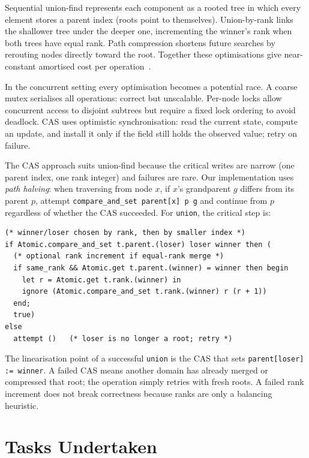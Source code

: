 \documentclass[11pt,a4paper]{article}
\begin{document}
Sequential union-find represents each component as a rooted tree in which every
element stores a parent index (roots point to themselves).  Union-by-rank links
the shallower tree under the deeper one, incrementing the winner's rank when
both trees have equal rank.  Path compression shortens future searches by
rerouting nodes directly toward the root.  Together these optimisations give
near-constant amortised cost per operation~\cite{AoMPP}.

In the concurrent setting every optimisation becomes a potential race.
A coarse mutex serialises all operations: correct but unscalable.  Per-node
locks allow concurrent access to disjoint subtrees but require a fixed lock
ordering to avoid deadlock.  CAS uses optimistic synchronisation: read the
current state, compute an update, and install it only if the field still holds
the observed value; retry on failure.

The CAS approach suits union-find because the critical writes are narrow
(one parent index, one rank integer) and failures are rare.  Our implementation
uses \emph{path halving}: when traversing from node $x$, if $x$'s grandparent
$g$ differs from its parent $p$, attempt \texttt{compare\_and\_set parent[x] p g}
and continue from $p$ regardless of whether the CAS succeeded.  For
\texttt{union}, the critical step is:

\begin{lstlisting}[language=caml,caption={CAS link in \texttt{union} (\texttt{cas\_union\_find.ml}).},label={lst:cas-union}]
(* winner/loser chosen by rank, then by smaller index *)
if Atomic.compare_and_set t.parent.(loser) loser winner then (
  (* optional rank increment if equal-rank merge *)
  if same_rank && Atomic.get t.parent.(winner) = winner then begin
    let r = Atomic.get t.rank.(winner) in
    ignore (Atomic.compare_and_set t.rank.(winner) r (r + 1))
  end;
  true)
else
  attempt ()   (* loser is no longer a root; retry *)
\end{lstlisting}

The linearisation point of a successful \texttt{union} is the CAS that sets
\texttt{parent[loser] := winner}.  A failed CAS means another domain has
already merged or compressed that root; the operation simply retries with fresh
roots.  A failed rank increment does not break correctness because ranks are
only a balancing heuristic.

\section{Tasks Undertaken}
\label{sec:tasks}
\end{document}
